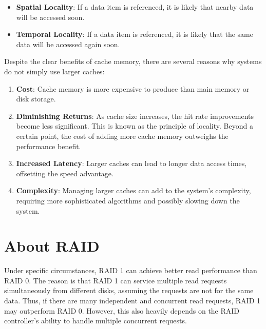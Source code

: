 \documentclass{article}
\begin{document}
\begin{itemize}
	\item \textbf{Spatial Locality}: If a data item is referenced, it is likely that nearby data will be accessed soon.
	\item \textbf{Temporal Locality}: If a data item is referenced, it is likely that the same data will be accessed again soon.
\end{itemize}

Despite the clear benefits of cache memory, there are several reasons why systems do not simply use larger caches:

\begin{enumerate}
	\item \textbf{Cost}: Cache memory is more expensive to produce than main memory or disk storage.
	\item \textbf{Diminishing Returns}: As cache size increases, the hit rate improvements become less significant.
	      This is known as the principle of locality. Beyond a certain point, the cost of adding more cache memory
	      outweighs the performance benefit.
	\item \textbf{Increased Latency}: Larger caches can lead to longer data access times, offsetting the speed advantage.
	\item \textbf{Complexity}: Managing larger caches can add to the system's complexity, requiring more sophisticated
	      algorithms and possibly slowing down the system.
\end{enumerate}


\section{About RAID}%
Under specific circumstances, RAID 1 can achieve better read performance than RAID 0. The reason is
that RAID 1 can service multiple read requests simultaneously from different disks, assuming the
requests are not for the same data. Thus, if there are many independent and concurrent read requests,
RAID 1 may outperform RAID 0. However, this also heavily depends on the RAID controller's ability
to handle multiple concurrent requests.
\end{document}
